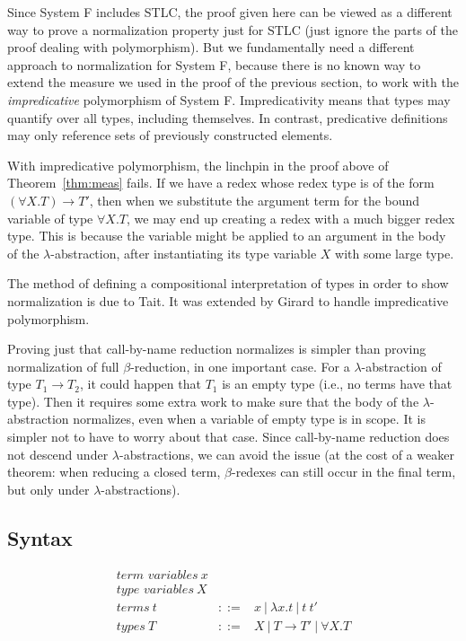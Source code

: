\documentclass{article}
\begin{document}
Since System F includes STLC, the proof given here can be viewed as a
different way to prove a normalization property just for STLC (just
ignore the parts of the proof dealing with polymorphism).  But we
fundamentally need a different approach to normalization for System F,
because there is no known way to extend the measure we used in the
proof of the previous section, to work with the \emph{impredicative} polymorphism
of System F.  Impredicativity means that types may quantify over all types,
including themselves.  In contrast, predicative definitions may only
reference sets of previously constructed elements.

With impredicative polymorphism, the linchpin in the proof above of
Theorem~\ref{thm:meas} fails.  If we have a redex whose redex type is
of the form $(\forall X.T) \to T'$, then when we substitute the
argument term for the bound variable of type $\forall X.T$, we may end
up creating a redex with a much bigger redex type.  This is because
the variable might be applied to an argument in the body of the
$\lambda$-abstraction, after instantiating its type variable $X$ with
some large type.

The method of defining a compositional interpretation of types in
order to show normalization is due to Tait.  It was extended by Girard
to handle impredicative polymorphism.

Proving just that call-by-name reduction normalizes is simpler than
proving normalization of full $\beta$-reduction, in one important
case.  For a $\lambda$-abstraction of type $T_1 \to T_2$, it could
happen that $T_1$ is an empty type (i.e., no terms have that type).
Then it requires some extra work to make sure that the body of the
$\lambda$-abstraction normalizes, even when a variable of empty type
is in scope.  It is simpler not to have to worry about that case.
Since call-by-name reduction does not descend under
$\lambda$-abstractions, we can avoid the issue (at the cost of a
weaker theorem: when reducing a closed term, $\beta$-redexes can still
occur in the final term, but only under $\lambda$-abstractions).

\subsection{Syntax}
\label{sec:syntax}

\[
\begin{array}{lll}
\textit{term variables}\ x & \ & \ \\
\textit{type variables}\ X & \ & \ \\
\textit{terms}\ t & ::= & x \ |\ \lambda x .t\ |\ t\ t'\\
\textit{types}\ T & ::= & X\ |\ T \to T'\ |\ \forall X.T
\end{array}
\]
\end{document}
